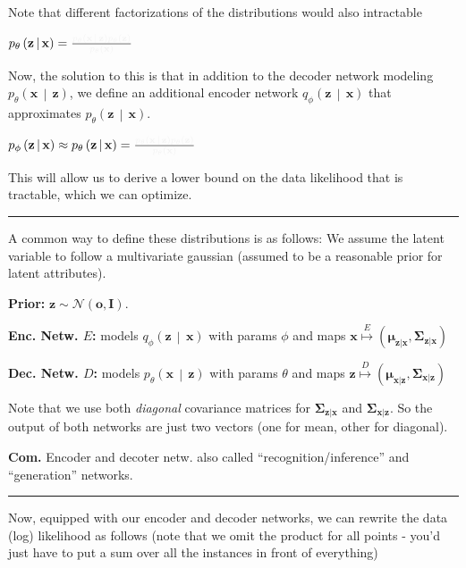 \documentclass[a2paper,4pt]{extarticle}
\newcommand{\tcr}[1]{\textcolor{lighttext}{#1}}
\newcommand{\tcg}[1]{\textcolor{lighttext}{#1}}
\newcommand{\tcr}[1]{\textcolor{red}{#1}}
\newcommand{\tcg}[1]{\textcolor{green}{#1}}
\newcommand{\cN}{\mathcal{N}}
\newcommand{\Dist}[2]{#1\left( #2 \right)}
\newcommand{\cDist}[3]{#1\left( #2 \,\middle|\, #3 \right)}
\newcommand{\mat}[1]{\mathbf{#1}}
\renewcommand{\vec}[1]{\mathbf{#1}}
\newcommand{\vo}{\vec{o}}
\newcommand{\vx}{\vec{x}}
\newcommand{\vz}{\vec{z}}
\newcommand{\vmu}{\boldsymbol{\mu}}
\newcommand{\MI}{\mat{I}}
\newcommand{\MSigma}{\mat{\Sigma}}
\newcommand{\Com}{\textbf{Com.} }
\newcommand{\sep}{\vspace{0pt}\noindent\hrule\vspace{0pt}}
\newcommand{\sep}{\vspace{5pt}\noindent\hrule\vspace{5pt}}
\begin{document}
\begin{landscape}
\begin{multicols*}{7}
Note that different factorizations of the distributions would also intractable

$\cDist{p_\theta}{\vz}{\vx}=\frac{\tcg{\cDist{p_\theta}{\vx}{\vz}
\Dist{p_\theta}{\vz}}}{\tcr{\Dist{p_\theta}{\vx}}}$

Now, the solution to this is that in addition to the decoder network modeling
$\cDist{p_\theta}{\vx}{\vz}$, we define an additional encoder network
$\cDist{q_\phi}{\vz}{\vx}$ that approximates $\cDist{p_\theta}{\vz}{\vx}$.

$
\cDist{p_\phi}{\vz}{\vx}
\approx
\cDist{p_\theta}{\vz}{\vx}=\frac{\tcg{\cDist{p_\theta}{\vx}{\vz}
\Dist{p_\theta}{\vz}}}{\tcr{\Dist{p_\theta}{\vx}}}
$

This will allow us to derive a lower bound on the data likelihood that is
tractable, which we can optimize.

\sep

A common way to define these distributions is as follows: We assume the latent
variable to follow a multivariate gaussian (assumed to be a reasonable prior for
latent attributes).

\textbf{Prior:} $\vz\sim\cN(\vo,\MI)$.

\textbf{Enc. Netw. $E$:} models $\cDist{q_\phi}{\vz}{\vx}$ with params
$\phi$ and maps $\vx\stackrel{E}{\mapsto}(\vmu_{\vz|\vx},\MSigma_{\vz|\vx})$

\textbf{Dec. Netw. $D$:} models $\cDist{p_\theta}{\vx}{\vz}$ with params
$\theta$ and maps $\vz\stackrel{D}{\mapsto}(\vmu_{\vx|\vz},\MSigma_{\vx|\vz})$

Note that we use both \emph{diagonal} covariance matrices for
$\MSigma_{\vz|\vx}$ and $\MSigma_{\vx|\vz}$. So the output of both networks are
just two vectors (one for mean, other for diagonal).

\Com Encoder and decoter netw. also called ``recognition/inference'' and
``generation'' networks.

\sep

Now, equipped with our encoder and decoder networks, we can rewrite the data
(log) likelihood as follows (note that we omit the product for all points -
you'd just have to put a sum over all the instances in front of everything)


\end{multicols*}
\end{landscape}
\end{document}
